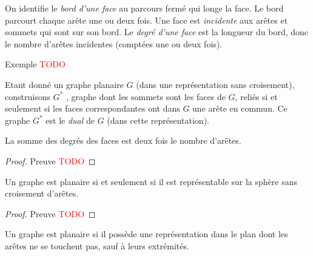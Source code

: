 \begin{mydef}
  On identifie le \emph{bord d'une face} au parcours fermé qui longe la face. Le bord parcourt chaque arête une ou deux fois. 
  Une face est \emph{incidente} aux arêtes et sommets qui sont sur son bord.
  Le \emph{degré d'une face} est la longueur du bord, donc le nombre d'arêtes incidentes (comptées une ou deux fois).
\end{mydef}
\begin{myexem}
  Exemple \textcolor{red}{TODO}
\end{myexem}

\begin{mydef}
  Etant donné un graphe planaire $G$ (dans une représentation sans croisement), construisons $G^*$ , graphe dont les sommets sont les faces de $G$, reliés si et seulement si les faces correspondantes ont dans $G$ une arête en commun. Ce graphe $G^*$ est le \emph{dual} de $G$ (dans cette représentation).
\end{mydef}

\begin{mytheo}
  La somme des degrés des faces est deux fois le nombre d'arêtes.
  \begin{proof}
    Preuve \textcolor{red}{TODO}
  \end{proof}
\end{mytheo}

\begin{mytheo}
  Un graphe est planaire si et seulement si il est représentable sur la sphère sans croisement d'arêtes.
  \begin{proof}
    Preuve \textcolor{red}{TODO}
  \end{proof}
\end{mytheo}


Un graphe est planaire si il possède une représentation dans le plan dont les arêtes ne se touchent pas, sauf à leurs extrémités.\\

